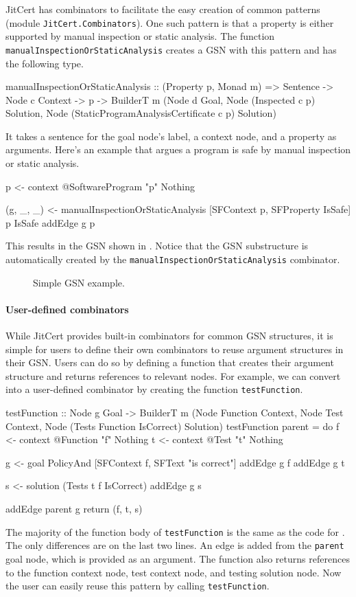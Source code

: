 \documentclass{article}
\newcommand{\jitcert}{JitCert\xspace}
\begin{document}
\jitcert has combinators to facilitate the easy creation of common patterns (module \texttt{JitCert.Combinators}). 
One such pattern is that a property is either supported by manual inspection or static analysis. 
The function \texttt{manualInspectionOrStaticAnalysis} creates a GSN with this pattern and has the following type.
\begin{mcode}
manualInspectionOrStaticAnalysis :: (Property p, Monad m) => Sentence -> Node c Context -> p -> BuilderT m (Node d Goal, Node (Inspected c p) Solution, Node (StaticProgramAnalysisCertificate c p) Solution)
\end{mcode}
It takes a sentence for the goal node's label, a context node, and a property as arguments. 
Here's an example that argues a program is safe by manual inspection or static analysis. 
\begin{mcode}
p <- context @SoftwareProgram "p" Nothing

(g, _, _) <- manualInspectionOrStaticAnalysis [SFContext p, SFProperty IsSafe] p IsSafe
addEdge g p
\end{mcode}
This results in the GSN shown in .
Notice that the GSN substructure is automatically created by the \texttt{manualInspectionOrStaticAnalysis} combinator. 

\begin{figure}
\centering
{}
\caption{Simple GSN example.}
\label{fig:fig8}
\end{figure}

\paragraph{User-defined combinators} While JitCert provides built-in combinators for common GSN structures, it is simple for users to define their own combinators to reuse argument structures in their GSN. 
Users can do so by defining a function that creates their argument structure and returns references to relevant nodes. 
For example, we can convert  into a user-defined combinator by creating the function \texttt{testFunction}. 
\begin{mcode}
testFunction :: Node g Goal -> BuilderT m (Node Function Context, 
    Node Test Context, Node (Tests Function IsCorrect) Solution)
testFunction parent = do
  f <- context @Function "f" Nothing
  t <- context @Test "t" Nothing

  g <- goal PolicyAnd [SFContext f, SFText "is correct"]
  addEdge g f
  addEdge g t

  s <- solution (Tests t f IsCorrect)
  addEdge g s

  addEdge parent g
  return (f, t, s)
\end{mcode}
The majority of the function body of \texttt{testFunction} is the same as the code for . 
The only differences are on the last two lines. 
An edge is added from the \texttt{parent} goal node, which is provided as an argument. 
The function also returns references to the function context node, test context node, and testing solution node.
Now the user can easily reuse this pattern by calling \texttt{testFunction}. 
\end{document}
